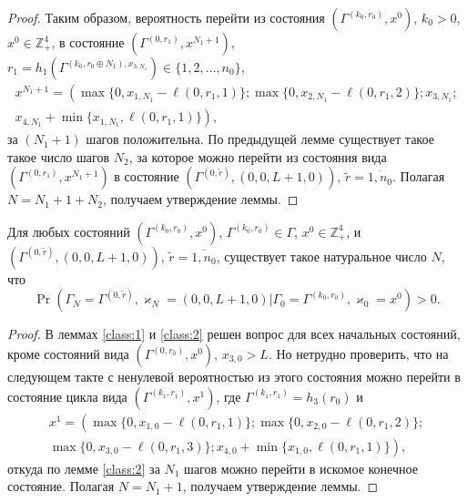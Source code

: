 \documentclass[a4paper,12pt,russian]{extarticle}
\begin{document}
\begin{proof}
Таким образом, вероятность перейти из состояния $(\Gamma^{(k_0,r_0)},x^0)$, $k_0>0$, $x^0 \in \mathbb{Z}_+^4$, в состояние $(\Gamma^{(0,r_1)},x^{N_1+1})$, $r_1=h_1(\Gamma^{(k_0,r_0\oplus N_1),x_{3,N_1}}) \in \{1, 2, \ldots, n_0\}$,
\begin{multline*}
x^{N_1+1}=\left(\max{\{0,x_{1,N_1} - \ell(0,r_1,1)\}};
\max{\{0,x_{2,N_1} - \ell(0,r_1,2)\}};x_{3,N_1};\right.\\
\left.
x_{4,N_1} + \min{\{x_{1,N_1}, \ell(0,r_1,1)\}}\right),
\end{multline*}
за $(N_1+1)$ шагов положительна. По предыдущей лемме существует такое такое число шагов $N_2$, за которое можно перейти из состояния вида $(\Gamma^{(0,r_1)},x^{N_1+1})$ в состояние $(\Gamma^{(0,\tilde{r})},(0,0,L+1,0))$, $\tilde{r}=\overline{1,n_0}$. Полагая $N=N_1+1+N_2$, получаем утверждение леммы.
\end{proof}

\begin{lemma}
Для любых состояний $(\Gamma^{(k_0,r_0)},x^0)$, $\Gamma^{(k_0,r_0)} \in \Gamma$, $x^0 \in \mathbb{Z}_+^4$, и $(\Gamma^{(0,\tilde{r})},(0,0,L+1,0))$, $\tilde{r} = \overline{1,n_0}$, существует такое натуральное число $N$, что 
\begin{equation*}
\Pr(\Gamma_{N}=\Gamma^{(0,\tilde{r} )}, \varkappa_{N}=(0,0,L+1,0)|
\Gamma_{0}=\Gamma^{(k_0,r_0)}, \varkappa_{0}=x^0)>0.
\end{equation*}
\end{lemma}
\begin{proof}
В леммах \eqref{class:1} и \eqref{class:2} решен вопрос для всех начальных состояний, кроме состояний вида $(\Gamma^{(0,r_0)},x^0)$, $x_{3,0}>L$. Но нетрудно проверить, что на следующем такте с ненулевой вероятностью из этого состояния можно перейти в состояние цикла вида $(\Gamma^{(k_1,r_1)},x^1)$, где $\Gamma^{(k_1,r_1)} = h_3(r_0)$ и 
\begin{multline*}
x^{1}=\left(\max{\{0,x_{1,0} - \ell(0,r_1,1)\}};
\max{\{0,x_{2,0} - \ell(0,r_1,2)\}};\right.\\
\left.
\max{\{0,x_{3,0} - \ell(0,r_1,3)\}};
x_{4,0} + \min{\{x_{1,0}, \ell(0,r_1,1)\}}\right),
\end{multline*}
откуда по лемме \eqref{class:2} за $N_1$ шагов можно перейти в искомое конечное состояние. Полагая $N=N_1+1$, получаем утверждение леммы.
\end{proof}
\end{document}
